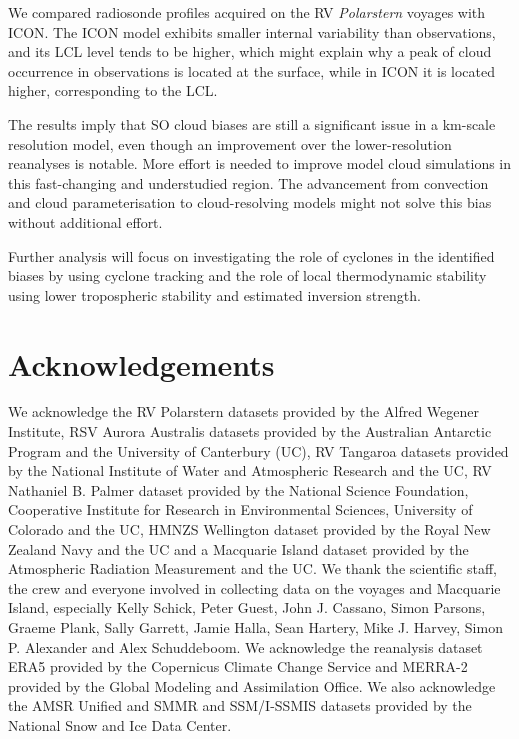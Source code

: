 \documentclass[12pt,a4paper]{article}
\begin{document}
We compared radiosonde proﬁles acquired on the RV \emph{Polarstern} voyages
with ICON.  The ICON model exhibits smaller internal variability than
observations, and its LCL level tends to be higher, which might explain why a
peak of cloud occurrence in observations is located at the surface, while in
ICON it is located higher, corresponding to the LCL.

The results imply that SO cloud biases are still a significant
issue in a km-scale resolution model, even though an improvement over the
lower-resolution reanalyses is notable. More effort is needed to improve model
cloud simulations in this fast-changing and understudied region. The
advancement from convection and cloud parameterisation to cloud-resolving models
might not solve this bias without additional effort.

Further analysis will focus on investigating the role of cyclones in the
identified biases by using cyclone tracking and the role of local thermodynamic
stability using lower tropospheric stability and estimated inversion strength.

\section*{Acknowledgements}

We acknowledge the RV Polarstern datasets provided by the Alfred Wegener
Institute, RSV Aurora Australis datasets provided by the Australian Antarctic
Program and the University of Canterbury (UC), RV Tangaroa datasets provided by
the National Institute of Water and Atmospheric Research and the UC, RV
Nathaniel B. Palmer dataset provided by the National Science Foundation,
Cooperative Institute for Research in Environmental Sciences, University of
Colorado and the UC, HMNZS Wellington dataset provided by the Royal New Zealand
Navy and the UC and a Macquarie Island dataset provided by the Atmospheric
Radiation Measurement and the UC. We thank the scientiﬁc staff, the crew and
everyone involved in collecting data on the voyages and Macquarie Island,
especially Kelly Schick, Peter Guest, John J. Cassano, Simon
Parsons, Graeme Plank, Sally Garrett, Jamie Halla, Sean Hartery, Mike J.
Harvey, Simon P. Alexander and Alex Schuddeboom. We acknowledge the reanalysis
dataset ERA5 provided by the Copernicus Climate Change Service and MERRA-2
provided by the Global Modeling and Assimilation Office. We also acknowledge the
AMSR Uniﬁed and SMMR and SSM/I-SSMIS datasets provided by the National Snow and
Ice Data Center.
\end{document}
